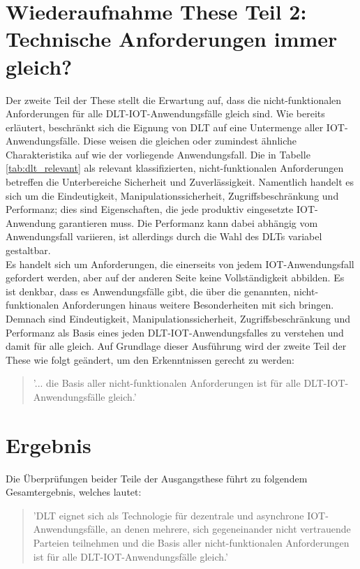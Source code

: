 \section{Wiederaufnahme These Teil 2: Technische Anforderungen immer gleich?}
\label{sec:discussion:part2}
Der zweite Teil der These stellt die Erwartung auf, dass die nicht-funktionalen Anforderungen für alle \ac{DLT}-\ac{IOT}-Anwendungsfälle gleich sind. Wie bereits erläutert, beschränkt sich die Eignung von \ac{DLT} auf eine Untermenge aller \ac{IOT}-Anwendungsfälle. Diese weisen die gleichen oder zumindest ähnliche Charakteristika auf wie der vorliegende Anwendungsfall. Die in Tabelle \ref{tab:dlt_relevant} als relevant klassifizierten, nicht-funktionalen Anforderungen betreffen die Unterbereiche Sicherheit und Zuverlässigkeit. Namentlich handelt es sich um die Eindeutigkeit, Manipulationssicherheit, Zugriffsbeschränkung und Performanz; dies sind Eigenschaften, die jede produktiv eingesetzte \ac{IOT}-Anwendung garantieren muss. Die Performanz kann dabei abhängig vom Anwendungsfall variieren, ist allerdings durch die Wahl des \acp{DLT} variabel gestaltbar.\\
Es handelt sich um Anforderungen, die einerseits von jedem \ac{IOT}-Anwendungsfall gefordert werden, aber auf der anderen Seite keine Vollständigkeit abbilden. Es ist denkbar, dass es Anwendungsfälle gibt, die über die genannten, nicht-funktionalen Anforderungen hinaus weitere Besonderheiten mit sich bringen. Demnach sind Eindeutigkeit, Manipulationssicherheit, Zugriffsbeschränkung und Performanz als Basis eines jeden \ac{DLT}-\ac{IOT}-Anwendungsfalles zu verstehen und damit für alle gleich. Auf Grundlage dieser Ausführung wird der zweite Teil der These wie folgt geändert, um den Erkenntnissen gerecht zu werden:
\begin{quote}
  '... die Basis aller nicht-funktionalen Anforderungen ist für alle \ac{DLT}-\ac{IOT}-Anwendungsfälle gleich.'
\end{quote}


\section{Ergebnis}
\label{sec:discussion:result}
Die Überprüfungen beider Teile der Ausgangsthese führt zu folgendem Gesamtergebnis, welches lautet:
\begin{quote}
  '\ac{DLT} eignet sich als Technologie für dezentrale und asynchrone \ac{IOT}-Anwendungsfälle, an denen mehrere, sich gegeneinander nicht vertrauende Parteien teilnehmen und die Basis aller nicht-funktionalen Anforderungen ist für alle \ac{DLT}-\ac{IOT}-Anwendungsfälle gleich.'
\end{quote}
